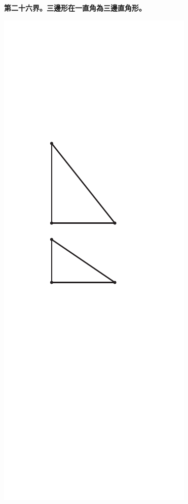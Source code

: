 \documentclass[12pt,b5paper,landscape]{article}
\newcommand{\cthm}[1]{{
\vspace{8pt}

\bfseries #1}}
\begin{document}
\begin{multicols}{2}
\cthm{第二十六界。三邊形在一直角為三邊直角形。}
\begin{center}
\includegraphics[angle=90]{eu17}
\end{center}


\end{multicols}
\end{document}

